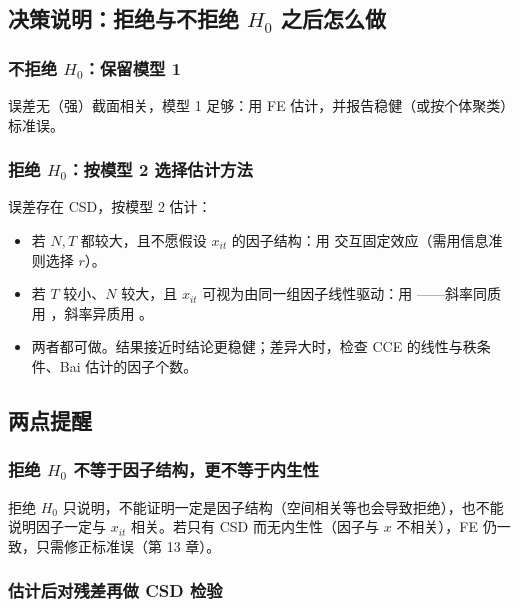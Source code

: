 \subsection{决策说明：拒绝与不拒绝 \texorpdfstring{$H_0$}{H0} 之后怎么做}

\subsubsection{不拒绝 \texorpdfstring{$H_0$}{H0}：保留模型 1}

误差无（强）截面相关，模型 1 足够：用 FE 估计，并报告稳健（或按个体聚类）标准误。

\subsubsection{拒绝 \texorpdfstring{$H_0$}{H0}：按模型 2 选择估计方法}

误差存在 CSD，按模型 2 估计：
\begin{itemize}
  \item 若 $N,T$ 都较大，且不愿假设 $x_{it}$ 的因子结构：用  交互固定效应（需用信息准则选择 $r$）。
  \item 若 $T$ 较小、$N$ 较大，且 $x_{it}$ 可视为由同一组因子线性驱动：用 ——斜率同质用 ，斜率异质用 。
  \item 两者都可做。结果接近时结论更稳健；差异大时，检查 CCE 的线性与秩条件、Bai 估计的因子个数。
\end{itemize}

\subsection{两点提醒 \tagext}

\subsubsection{拒绝 \texorpdfstring{$H_0$}{H0} 不等于因子结构，更不等于内生性}

拒绝 $H_0$ 只说明，不能证明一定是因子结构（空间相关等也会导致拒绝），也不能说明因子一定与 $x_{it}$ 相关。若只有 CSD 而无内生性（因子与 $x$ 不相关），FE 仍一致，只需修正标准误（第 13 章）。

\subsubsection{估计后对残差再做 CSD 检验}

